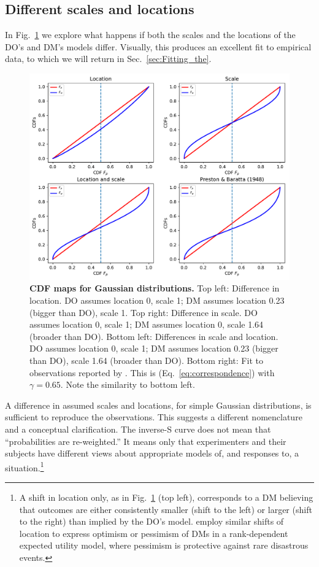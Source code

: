 \documentclass[a4paper, 12pt]{article}
\newcommand{\eref}[1]{(Eq.~\ref{eq:#1})}
\newcommand{\flabel}[1]{\label{fig:#1}}
\newcommand{\fref}[1]{Fig.~\ref{fig:#1}}
\newcommand{\seclabel}[1]{\label{sec:#1}}
\newcommand{\secref}[1]{Sec.~\ref{sec:#1}}
\begin{document}
\FloatBarrier

\subsection{Different scales and locations\seclabel{A_mismatch}}

In \fref{Gauss_scale_location_both_KT} we explore what happens if both the scales and the locations of the DO's and DM's models differ. Visually, this produces an excellent fit to empirical data, to which we will return in \secref{Fitting_the}.
\begin{figure}[!htb]
\centering
\includegraphics[width=1.0\textwidth]{./figs/Gauss_scale_location_both_KT.pdf}
\caption{\textbf{CDF maps for Gaussian distributions.} Top left: Difference in location. DO assumes location 0, scale 1; DM assumes location 0.23 (bigger than DO), scale 1. Top right: Difference in scale. DO assumes location 0, scale 1; DM assumes location 0, scale 1.64 (broader than DO). Bottom left: Differences in scale and location. DO assumes location 0, scale 1; DM assumes location 0.23 (bigger than DO), scale 1.64 (broader than DO). Bottom right: Fit to observations reported by \textcite{TverskyKahneman1992}. This is \eref{correspondence} with $\gamma=0.65$. Note the similarity to bottom left.}
\flabel{Gauss_scale_location_both_KT}
\end{figure}
A difference in assumed scales and locations, for simple Gaussian distributions, is sufficient to reproduce the observations. This suggests a different nomenclature and a conceptual clarification. The inverse-S curve does not mean that ``probabilities are re-weighted.'' It means only that experimenters and their subjects have different views about appropriate models of, and responses to, a situation.\footnote{A shift in location only, as in \fref{Gauss_scale_location_both_KT} (top left), corresponds to a DM believing that outcomes are either consistently smaller (shift to the left) or larger (shift to the right) than implied by the DO's model. \textcite{PriceJones2020} employ similar shifts of location to express optimism or pessimism of DMs in a rank-dependent expected utility model, where pessimism is protective against rare disastrous events.}
\end{document}
